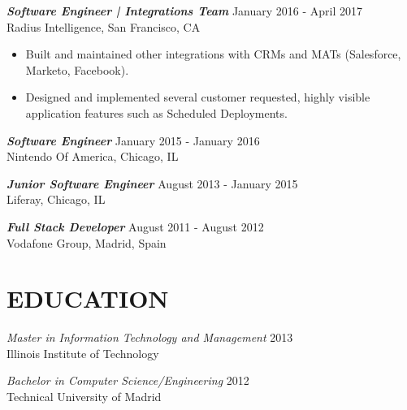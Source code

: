 \documentclass[overlapped, 10pt]{res} %
\begin{document}
\begin{resume}
{\sl \textbf{Software Engineer | Integrations Team}} \hfill January 2016 - April 2017 \\
Radius Intelligence, San Francisco, CA
\begin{itemize} \itemsep -2pt %
\item Built and maintained other integrations with CRMs and MATs (Salesforce, Marketo, Facebook).
\item Designed and implemented several customer requested, highly visible application features such as Scheduled Deployments.
\end{itemize}
 
{\sl \textbf{Software Engineer}} \hfill January 2015 - January 2016 \\
Nintendo Of America, Chicago, IL

{\sl \textbf{Junior Software Engineer}} \hfill August 2013 - January 2015 \\
Liferay, Chicago, IL

{\sl \textbf{Full Stack Developer}} \hfill August 2011 - August 2012 \\
Vodafone Group, Madrid, Spain

 
\section{EDUCATION}\smallskip

{\sl Master in Information Technology and Management} \hfill 2013 \\
Illinois Institute of Technology

{\sl Bachelor in Computer Science/Engineering} \hfill 2012 \\
Technical University of Madrid

\end{resume}
\end{document}
